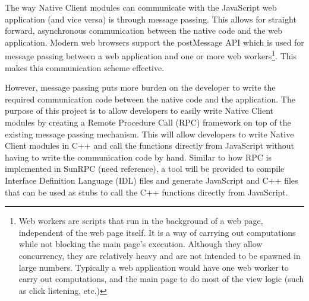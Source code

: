 The way Native Client modules can communicate with the JavaScript web application (and vice versa) is through message passing. This allows for straight forward, asynchronous communication between the native code and the web application. Modern web browsers support the postMessage API which is used for message passing between a web application and one or more web workers\footnote{Web workers\cite{webworkersw3c} are scripts that run in the background of a web page, independent of the web page itself. It is a way of carrying out computations while not blocking the main page's execution. Although they allow concurrency, they are relatively heavy and are not intended to be spawned in large numbers. Typically a web application would have one web worker to carry out computations, and the main page to do most of the view logic (such as click listening, etc.)}. This makes this communication scheme effective.

However, message passing puts more burden on the developer to write the required communication code between the native code and the application. The purpose of this project is to allow developers to easily write Native Client modules by creating a Remote Procedure Call (RPC) framework on top of the existing message passing mechanism. This will allow developers to write Native Client modules in C++ and call the functions directly from JavaScript without having to write the communication code by hand. Similar to how RPC is implemented in SunRPC (need reference), a tool will be provided to compile Interface Definition Language (IDL) files and generate JavaScript and C++ files that can be used as stubs to call the C++ functions directly from JavaScript.

